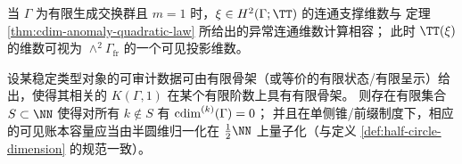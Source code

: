 \begin{remark}[交换群情形的兼容性]\label{rem:cdim2-abelian-compatibility}
当 \(\Gamma\) 为有限生成交换群且 \(m=1\) 时，\(\xi\in H^2(\Gamma;\TT)\) 的连通支撑维数与
定理 \ref{thm:cdim-anomaly-quadratic-law} 所给出的异常连通维数计算相容；
此时 \(\TT(\xi)\) 的维数可视为 \(\wedge^2\Gamma_{\mathrm{fr}}\) 的一个可见投影维数。
\end{remark}

\begin{conjecture}[账本阶次的有限谱性]\label{conj:cdim-higher-finite-spectrum}
设某稳定类型对象的可审计数据可由有限骨架（或等价的有限状态/有限呈示）给出，使得其相关的 \(K(\Gamma,1)\) 在某个有限阶数上具有有限骨架。
则存在有限集合 \(S\subset\NN\) 使得对所有 \(k\notin S\) 有 \(\operatorname{cdim}^{(k)}(\Gamma)=0\)；
并且在单侧锥/前缀制度下，相应的可见账本容量应当由半圆维归一化在 \(\tfrac12\NN\) 上量子化（与定义 \ref{def:half-circle-dimension} 的规范一致）。
\end{conjecture}

\endinput
